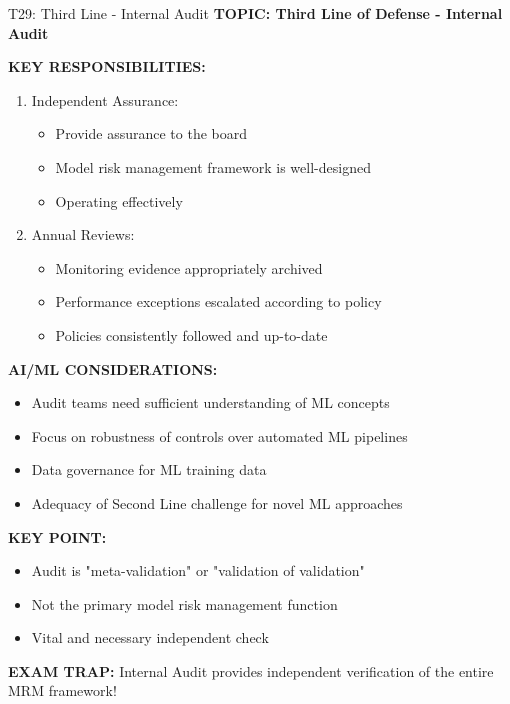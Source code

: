 \documentclass[8pt]{beamer}
\begin{document}
	\begin{frame}{T29: Third Line - Internal Audit}
		\fontsize{6.5}{7.5}\selectfont
		\textbf{TOPIC: Third Line of Defense - Internal Audit}
		
		\vspace{0.1cm}
		\textbf{KEY RESPONSIBILITIES:}
		\begin{enumerate}
			\item \textcolor{myblue}{Independent Assurance:}
			\begin{itemize}
				\item Provide assurance to the board
				\item Model risk management framework is well-designed
				\item Operating effectively
			\end{itemize}
			\item \textcolor{myblue}{Annual Reviews:}
			\begin{itemize}
				\item Monitoring evidence appropriately archived
				\item Performance exceptions escalated according to policy
				\item Policies consistently followed and up-to-date
			\end{itemize}
		\end{enumerate}
		
		\vspace{0.1cm}
		\textbf{AI/ML CONSIDERATIONS:}
		\begin{itemize}
			\item Audit teams need sufficient understanding of ML concepts
			\item Focus on robustness of controls over automated ML pipelines
			\item Data governance for ML training data
			\item Adequacy of Second Line challenge for novel ML approaches
		\end{itemize}
		
		\vspace{0.1cm}
		\textbf{KEY POINT:}
		\begin{itemize}
			\item Audit is "meta-validation" or "validation of validation"
			\item Not the primary model risk management function
			\item Vital and necessary independent check
		\end{itemize}
		
		\textcolor{myred}{\textbf{EXAM TRAP:}} Internal Audit provides \textcolor{myblue}{independent verification} of the entire MRM framework!
	\end{frame}
	
\end{document}
